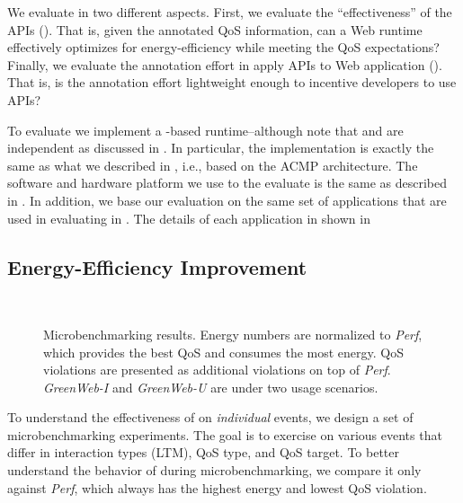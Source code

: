 We evaluate \greenweb in two different aspects. First, we evaluate the ``effectiveness'' of the \greenweb APIs (). That is, given the annotated QoS information, can a Web runtime effectively optimizes for energy-efficiency while meeting the QoS expectations? Finally, we evaluate the annotation effort in apply \greenweb APIs to Web application (). That is, is the annotation effort lightweight enough to incentive developers to use \greenweb APIs?

To evaluate \greenweb we implement a \webrt-based \greenweb runtime--although note that \webrt and \greenweb are independent as discussed in . In particular, the \webrt implementation is exactly the same as what we described in , i.e., based on the ACMP architecture. The software and hardware platform we use to the evaluate \greenweb is the same as described in . In addition, we base our evaluation on the same set of applications that are used in evaluating \ebs in . The details of each application in shown in 



\subsection{Energy-Efficiency Improvement}
\label{sec:lang:eval:effect}

\begin{figure}[p]
\centering
{}\\
\vspace*{25pt}
\caption{Microbenchmarking results. Energy numbers are normalized to \textit{Perf}, which provides the best QoS and consumes the most energy. QoS violations are presented as additional violations on top of \textit{Perf}. \textit{GreenWeb-I} and \textit{GreenWeb-U} are \greenweb under two usage scenarios.}
\label{fig:ubenchmark_results}
\end{figure}

To understand the effectiveness of \greenweb on \textit{individual} events, we design a set of microbenchmarking experiments. The goal is to exercise \greenweb on various events that differ in interaction types (LTM), QoS type, and QoS target. To better understand the behavior of \greenweb during microbenchmarking, we compare it only against \textit{Perf}, which always has the highest energy and lowest QoS violation.

